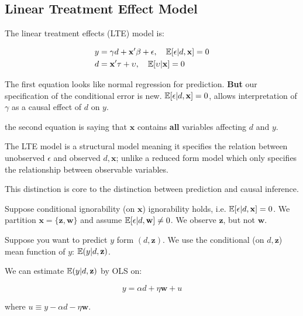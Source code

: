 \documentclass[11pt]{article}
\begin{document}
\subsection{Linear Treatment Effect Model}

The linear treatment effects (LTE) model is:

\begin{align*}
    y &= \gamma d + \mathbf{x^\prime}\beta + \epsilon, \quad \mathbb{E}[\epsilon|d,\mathbf{x}] = 0 \\
    d &= \mathbf{x^\prime}\tau + \upsilon, \quad \mathbb{E}[\upsilon|\mathbf{x}] = 0
\end{align*}

The first equation looks like normal regression for prediction. \textbf{But} our specification of the conditional error is new. $\mathbb{E}[\epsilon|d,\mathbf{x}] = 0$, allows interpretation of $\gamma$ as a causal effect of $d$ on $y$. 

the second equation is saying that $\mathbf{x}$ contains \textbf{all} variables affecting $d$ and $y$.

\begin{note}
    The LTE model is a structural model meaning it specifies the relation between unobserved $\epsilon$ and observed $d,\mathbf{x}$; unlike a reduced form model which only specifies the relationship between observable variables.

    This distinction is core to the distinction between prediction and causal inference.
\end{note}

\begin{procedure}
    \hspace{1in}
    Suppose conditional ignorability (on $\mathbf{x}$) ignorability holds, i.e. $\mathbb{E}[\epsilon|d,\mathbf{x}] = 0$. We partition $\mathbf{x} = \{\mathbf{z,w}\}$ and assume $\mathbb{E}[\epsilon|d,\mathbf{w}]\neq 0$. We observe $\mathbf{z}$, but not $\mathbf{w}$.

    Suppose you want to predict $y$ form $(d,\mathbf{z})$. We use the conditional (on $d,\mathbf{z}$) mean function of $y$: $\mathbb{E}(y|d,\mathbf{z})$.

    We can estimate $\mathbb{E}(y|d,\mathbf{z})$ by OLS on:

    \begin{equation}
        \label{LTE OLS}
        y = \alpha d + \eta \mathbf{w} + u
    \end{equation}

    where $u \equiv y - \alpha d - \eta \mathbf{w}$.
\end{procedure}
\end{document}
